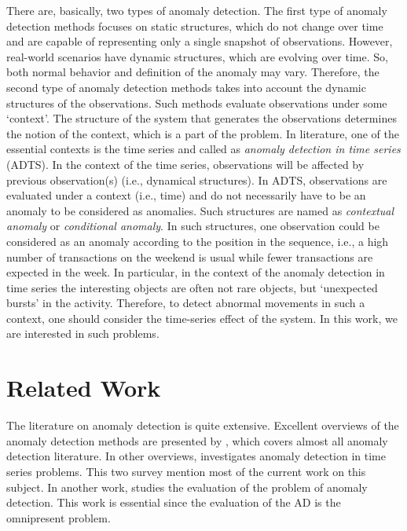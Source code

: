 There are, basically, two types of anomaly detection.
The first type of anomaly detection methods focuses on static structures, which do not change over time and are capable of representing only a single snapshot of observations\cite{ranshous2015anomaly}.
However, real-world scenarios have dynamic structures, which are evolving over time.
So, both normal behavior and definition of the anomaly may vary.
Therefore, the second type of anomaly detection methods takes into account the dynamic structures of the observations\cite{chandola2009anomaly}.
Such methods evaluate observations under some `context'. 
The structure of the system that generates the observations determines the notion of the context, which is a part of the problem.
In literature, one of the essential contexts is the time series and called as {\it anomaly detection in time series} (ADTS). 
In the context of the time series, observations will be affected by previous observation(s) (i.e., dynamical structures). 
In ADTS, observations are evaluated under a context (i.e., time) and do not necessarily have to be an anomaly to be considered as anomalies.
Such structures are named as {\it contextual anomaly} or {\it conditional anomaly}\cite{song2007conditional}. 
In such structures, one observation could be considered as an anomaly according to the position in the sequence, i.e., a high number of transactions on the weekend is usual while fewer transactions are expected in the week.
In particular, in the context of the anomaly detection in time series the interesting objects are often not rare objects, but `unexpected bursts' in the activity.
Therefore, to detect abnormal movements in such a context, one should consider the time-series effect of the system.
In this work, we are interested in such problems.

\section{Related Work}

The literature on anomaly detection is quite extensive. Excellent overviews of the anomaly detection methods are presented by \cite{chandola2009anomaly, hodge2004survey}, which covers almost all anomaly detection literature. In other overviews,  \cite{chandola2012anomaly, gupta2014outlier} investigates anomaly detection in time series problems. This two survey mention most of the current work on this subject.
In another work, \cite{chandola2008comparing} studies the evaluation of the problem of anomaly detection. This work is essential since the evaluation of the AD is the omnipresent problem.

